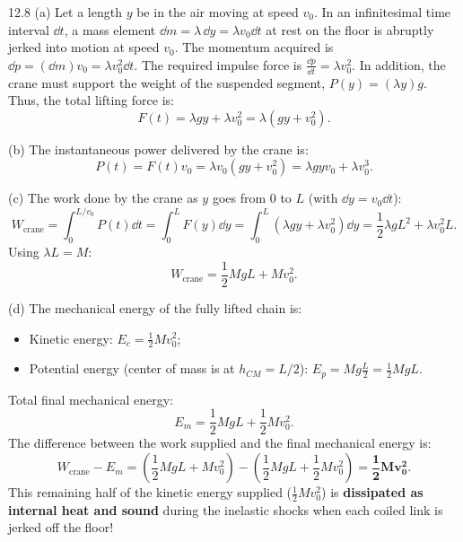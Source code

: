\begin{solution}{12.8}
(a) Let a length $y$ be in the air moving at speed $v_0$.
In an infinitesimal time interval $\dd t$, a mass element $\dd m = \lambda\,\dd y = \lambda v_0\dd t$ at rest on the floor is abruptly jerked into motion at speed $v_0$.
The momentum acquired is $\dd p = (\dd m)v_0 = \lambda v_0^2\dd t$.
The required impulse force is $\frac{\dd p}{\dd t} = \lambda v_0^2$.
In addition, the crane must support the weight of the suspended segment, $P(y) = (\lambda y)g$.
Thus, the total lifting force is:
\[
\boxed{F(t) = \lambda g y + \lambda v_0^2 = \lambda\left(gy + v_0^2\right).}
\]

(b) The instantaneous power delivered by the crane is:
\[
\boxed{P(t) = F(t)v_0 = \lambda v_0\left(gy + v_0^2\right) = \lambda g y v_0 + \lambda v_0^3.}
\]

(c) The work done by the crane as $y$ goes from $0$ to $L$ (with $\dd y = v_0\dd t$):
\[
W_{\text{crane}} = \int_0^{L/v_0} P(t)\dd t = \int_0^L F(y)\dd y = \int_0^L (\lambda g y + \lambda v_0^2)\dd y = \frac{1}{2}\lambda g L^2 + \lambda v_0^2 L.
\]
Using $\lambda L = M$:
\[
\boxed{W_{\text{crane}} = \frac{1}{2}MgL + Mv_0^2.}
\]

(d) The mechanical energy of the fully lifted chain is:
\begin{itemize}[leftmargin=1.4em,itemsep=2pt]
  \item Kinetic energy: $E_c = \frac{1}{2}Mv_0^2$;
  \item Potential energy (center of mass is at $h_{CM} = L/2$): $E_p = Mg\frac{L}{2} = \frac{1}{2}MgL$.
\end{itemize}
Total final mechanical energy:
\[
E_m = \frac{1}{2}MgL + \frac{1}{2}Mv_0^2.
\]
The difference between the work supplied and the final mechanical energy is:
\[
W_{\text{crane}} - E_m = \left(\frac{1}{2}MgL + Mv_0^2\right) - \left(\frac{1}{2}MgL + \frac{1}{2}Mv_0^2\right) = \mathbf{\frac{1}{2}Mv_0^2.}
\]
This remaining half of the kinetic energy supplied ($\frac{1}{2}Mv_0^2$) is \textbf{dissipated as internal heat and sound} during the inelastic shocks when each coiled link is jerked off the floor!
\end{solution}

